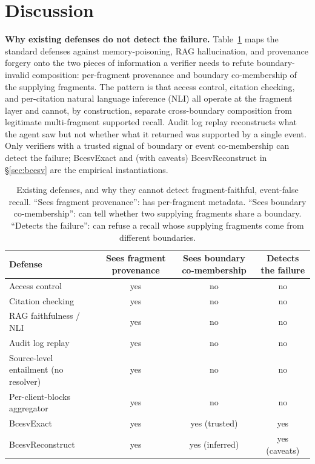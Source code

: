 \documentclass[conference,compsoc]{IEEEtran}
\begin{document}
\section{Discussion}\label{sec:discussion}

\textbf{Why existing defenses do not detect the failure.}
Table~\ref{tab:defenses} maps the standard defenses against memory-poisoning, RAG hallucination, and provenance forgery onto the two pieces of information a verifier needs to refute boundary-invalid composition: per-fragment provenance and boundary co-membership of the supplying fragments. The pattern is that access control, citation checking, and per-citation natural language inference (NLI) all operate at the fragment layer and cannot, by construction, separate cross-boundary composition from legitimate multi-fragment supported recall. Audit log replay reconstructs what the agent saw but not whether what it returned was supported by a single event. Only verifiers with a trusted signal of boundary or event co-membership can detect the failure; BcesvExact and (with caveats) BcesvReconstruct in \S\ref{sec:bcesv} are the empirical instantiations.

\begin{table}[t]
\centering
\caption{Existing defenses, and why they cannot detect fragment-faithful, event-false recall. ``Sees fragment provenance'': has per-fragment metadata. ``Sees boundary co-membership'': can tell whether two supplying fragments share a boundary. ``Detects the failure'': can refuse a recall whose supplying fragments come from different boundaries.}
\label{tab:defenses}
\small
\begin{tabular}{lccc}
\toprule
Defense & Sees fragment provenance & Sees boundary co-membership & Detects the failure \\
\midrule
Access control                & yes        & no            & no \\
Citation checking             & yes        & no            & no \\
RAG faithfulness / NLI        & yes        & no            & no \\
Audit log replay              & yes        & no            & no \\
Source-level entailment (no resolver) & yes        & no            & no \\
Per-client-blocks aggregator  & yes        & no            & no \\
\midrule
BcesvExact                    & yes        & yes (trusted) & yes \\
BcesvReconstruct              & yes        & yes (inferred)& yes (caveats) \\
\bottomrule
\end{tabular}
\end{table}
\end{document}
